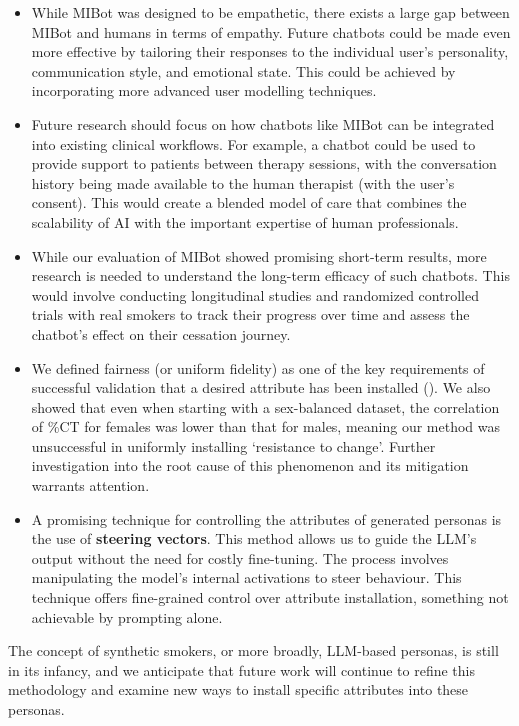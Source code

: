 \begin{itemize}
    \item While MIBot was designed to be empathetic, there exists a large gap between MIBot and humans in terms of empathy. Future chatbots could be made even more effective by tailoring their responses to the individual user's personality, communication style, and emotional state. This could be achieved by incorporating more advanced user modelling techniques.
    \item Future research should focus on how chatbots like MIBot can be integrated into existing clinical workflows. For example, a chatbot could be used to provide support to patients between therapy sessions, with the conversation history being made available to the human therapist (with the user's consent). This would create a blended model of care that combines the scalability of AI with the important expertise of human professionals.
    \item While our evaluation of MIBot showed promising short-term results, more research is needed to understand the long-term efficacy of such chatbots. This would involve conducting longitudinal studies and randomized controlled trials with real smokers to track their progress over time and assess the chatbot's effect on their cessation journey.
    \item  We defined fairness (or uniform fidelity) as one of the key requirements of successful validation that a desired attribute has been installed (). We also showed that even when starting with a sex-balanced dataset, the correlation of \%CT for females was lower than that for males, meaning our method was unsuccessful in uniformly installing `resistance to change'. Further investigation into the root cause of this phenomenon and its mitigation warrants attention.
    \item A promising technique for controlling the attributes of generated personas is the use of \textbf{steering vectors}. This method allows us to guide the LLM's output without the need for costly fine-tuning. The process involves manipulating the model's internal activations to steer behaviour. This technique offers fine-grained control over attribute installation, something not achievable by prompting alone.
\end{itemize}

The concept of synthetic smokers, or more broadly, LLM-based personas, is still in its infancy, and we anticipate that future work will continue to refine this methodology and examine new ways to install specific attributes into these personas.

